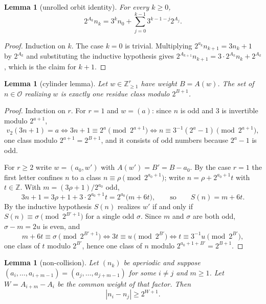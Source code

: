 \documentclass[11pt,reqno]{amsart}
\theoremstyle{plain}
\newtheorem{lemma}[theorem]{Lemma}
\theoremstyle{definition}
\numberwithin{equation}{section}
\newcommand{\Z}{\mathbb{Z}}
\newcommand{\Odd}{\mathcal{O}}
\begin{document}
\begin{lemma}[unrolled orbit identity]
\label{lem:unroll}
For every $k\ge0$,
\begin{equation}\label{eq:unroll}
2^{A_k}n_k=3^kn_0+\sum_{j=0}^{k-1}3^{k-1-j}2^{A_j}.
\end{equation}
\end{lemma}

\begin{proof}
Induction on $k$.  The case $k=0$ is trivial.  Multiplying
$2^{a_k}n_{k+1}=3n_k+1$ by $2^{A_k}$ and substituting the inductive
hypothesis gives
$2^{A_{k+1}}n_{k+1}=3\cdot2^{A_k}n_k+2^{A_k}$, which is the claim for $k+1$.
\end{proof}

\begin{lemma}[cylinder lemma]
\label{lem:cyl}
Let $w\in\Z_{\ge1}^r$ have weight $B=A(w)$.  The set of $n\in\Odd$ realizing
$w$ is exactly one residue class modulo $2^{B+1}$.
\end{lemma}

\begin{proof}
Induction on $r$.  For $r=1$ and $w=(a)$: since $n$ is odd and $3$ is
invertible modulo $2^{a+1}$,
\[
v_2(3n+1)=a
\iff 3n+1\equiv2^a\!\!\pmod{2^{a+1}}
\iff n\equiv3^{-1}(2^a-1)\!\!\pmod{2^{a+1}},
\]
one class modulo $2^{a+1}=2^{B+1}$, and it consists of odd numbers because
$2^a-1$ is odd.

For $r\ge2$ write $w=(a_0,w')$ with $A(w')=B'=B-a_0$.  By the case $r=1$ the
first letter confines $n$ to a class $n\equiv\rho\pmod{2^{a_0+1}}$; write
$n=\rho+2^{a_0+1}t$ with $t\in\Z$.  With $m=(3\rho+1)/2^{a_0}$ odd,
\[
3n+1=3\rho+1+3\cdot2^{a_0+1}t=2^{a_0}\bigl(m+6t\bigr),
\qquad\text{so}\qquad
S(n)=m+6t .
\]
By the inductive hypothesis $S(n)$ realizes $w'$ if and only if
$S(n)\equiv\sigma\pmod{2^{B'+1}}$ for a single odd $\sigma$.  Since $m$ and
$\sigma$ are both odd, $\sigma-m=2u$ is even, and
\[
m+6t\equiv\sigma\!\!\pmod{2^{B'+1}}
\iff 3t\equiv u\!\!\pmod{2^{B'}}
\iff t\equiv3^{-1}u\!\!\pmod{2^{B'}} ,
\]
one class of $t$ modulo $2^{B'}$, hence one class of $n$ modulo
$2^{a_0+1+B'}=2^{B+1}$.
\end{proof}

\begin{lemma}[non-collision]
\label{lem:collide}
Let $(n_k)$ be aperiodic and suppose
$(a_i,\dots,a_{i+m-1})=(a_j,\dots,a_{j+m-1})$ for some $i\ne j$ and $m\ge1$.
Let $W=A_{i+m}-A_i$ be the common weight of that factor.  Then
\[
|n_i-n_j|\ge2^{W+1}.
\]
\end{lemma}
\end{document}
